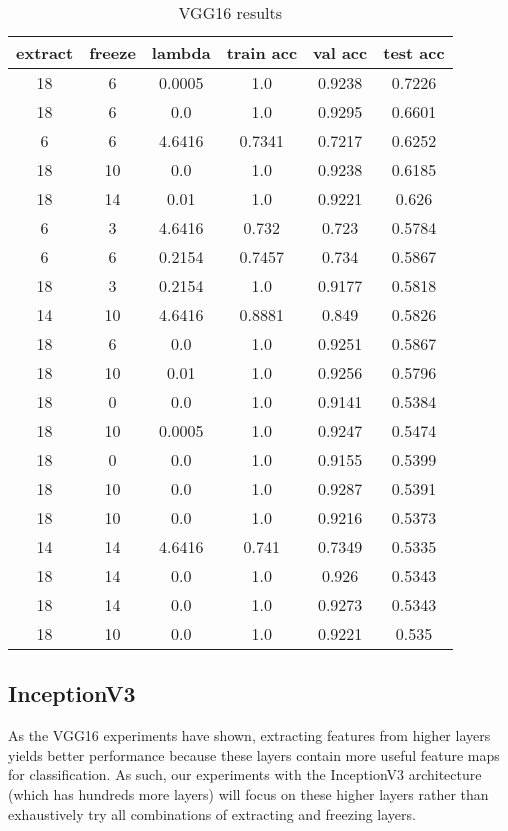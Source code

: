 \begin{table}[ht]
    \centering
\begin{tabular}{ |c|c|c|c|c|c| }
    \hline
    extract & freeze & lambda & train acc & val acc & test acc \\
    \hline
    18 & 6 & 0.0005 & 1.0 & 0.9238 & 0.7226 \\
    18 & 6 & 0.0 & 1.0 & 0.9295 & 0.6601 \\
    6 & 6 & 4.6416 & 0.7341 & 0.7217 & 0.6252 \\
    18 & 10 & 0.0 & 1.0 & 0.9238 & 0.6185 \\
    18 & 14 & 0.01 & 1.0 & 0.9221 & 0.626 \\
    6 & 3 & 4.6416 & 0.732 & 0.723 & 0.5784 \\
    6 & 6 & 0.2154 & 0.7457 & 0.734 & 0.5867 \\
    18 & 3 & 0.2154 & 1.0 & 0.9177 & 0.5818 \\
    14 & 10 & 4.6416 & 0.8881 & 0.849 & 0.5826 \\
    18 & 6 & 0.0 & 1.0 & 0.9251 & 0.5867 \\
    18 & 10 & 0.01 & 1.0 & 0.9256 & 0.5796 \\
    18 & 0 & 0.0 & 1.0 & 0.9141 & 0.5384 \\
    18 & 10 & 0.0005 & 1.0 & 0.9247 & 0.5474 \\
    18 & 0 & 0.0 & 1.0 & 0.9155 & 0.5399 \\
    18 & 10 & 0.0 & 1.0 & 0.9287 & 0.5391 \\
    18 & 10 & 0.0 & 1.0 & 0.9216 & 0.5373 \\
    14 & 14 & 4.6416 & 0.741 & 0.7349 & 0.5335 \\
    18 & 14 & 0.0 & 1.0 & 0.926 & 0.5343 \\
    18 & 14 & 0.0 & 1.0 & 0.9273 & 0.5343 \\
    18 & 10 & 0.0 & 1.0 & 0.9221 & 0.535 \\
    \hline
\end{tabular}
    \caption{VGG16 results}
    \label{table:vgg16}
\end{table}






\subsection{InceptionV3}

As the VGG16 experiments have shown, extracting features from higher layers yields better performance because these layers contain more useful feature maps for classification. As such, our experiments with the InceptionV3 architecture (which has hundreds more layers) will focus on these higher layers rather than exhaustively try all combinations of extracting and freezing layers.

